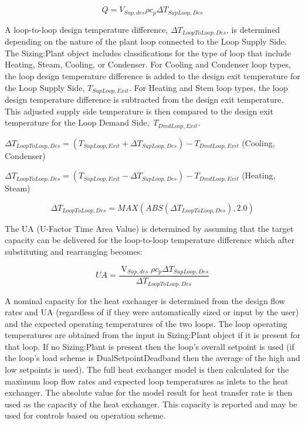 \begin{equation}
\dot Q = V_{Sup,des} \rho {c_p} \Delta {T_{SupLoop,Des}}
\end{equation}

A loop-to-loop design temperature difference, \(\Delta {T_{LoopToLoop,Des}}\), is determined depending on the nature of the plant loop connected to the Loop Supply Side. The Sizing:Plant object includes classifications for the type of loop that include Heating, Steam, Cooling, or Condenser. For Cooling and Condenser loop types, the loop design temperature difference is added to the design exit temperature for the Loop Supply Side, \({T_{SupLoop,Exit}}\). For Heating and Stem loop types, the loop design temperature difference is subtracted from the design exit temperature. This adjusted supply side temperature is then compared to the design exit temperature for the Loop Demand Side,~\({T_{DmdLoop,Exit}}\).

\(\Delta {T_{LoopToLoop,Des}} = \left( {{T_{SupLoop,Exit}} + \Delta {T_{SupLoop,Des}}} \right) - {T_{DmdLoop,Exit}}\) (Cooling, Condenser)

\(\Delta {T_{LoopToLoop,Des}} = \left( {{T_{SupLoop,Exit}} - \Delta {T_{SupLoop,Des}}} \right) - {T_{DmdLoop,Exit}}\) (Heating, Steam)

\begin{equation}
\Delta {T_{LoopToLoop,Des}} = MAX\left( {ABS\left( {\Delta {T_{LoopToLoop,Des}}} \right),2.0} \right)
\end{equation}

The UA (U-Factor Time Area Value) is determined by assuming that the target capacity can be delivered for the loop-to-loop temperature difference which after substituting and rearranging becomes:

\begin{equation}
UA = \frac{{{{\mathop {V}\limits }_{Sup,des}}\rho {c_p}\Delta {T_{SupLoop,Des}}}}{{\Delta {T_{LoopToLoop,Des}}}}
\end{equation}

A nominal capacity for the heat exchanger is determined from the design flow rates and UA (regardless of if they were automatically sized or input by the user) and the expected operating temperatures of the two loops. The loop operating temperatures are obtained from the input in Sizing:Plant object if it is present for that loop. If no Sizing:Plant is present then the loop's overall setpoint is used (if the loop's load scheme is DualSetpointDeadband then the average of the high and low setpoints is used). The full heat exchanger model is then calculated for the maximum loop flow rates and expected loop temperatures as inlets to the heat exchanger. The absolute value for the model result for heat transfer rate is then used as the capacity of the heat exchanger. This capacity is reported and may be used for controls based on operation scheme.

